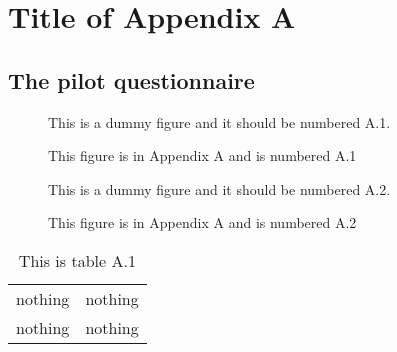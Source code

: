 \appendix
\renewcommand{\chaptermark}[1]%
	{\markboth{Appendix \thechapter. #1}{}}
\setcounter{chapter}{0}

\chapter{Title of Appendix A}
\label{appendixA}

\section{The pilot questionnaire}


\begin{figure}
This is a dummy figure and it should be numbered A.1.
\caption{This figure is in Appendix A and is numbered A.1}
\end{figure}

\begin{figure}
This is a dummy figure and it should be numbered A.2.
\caption{This figure is in Appendix A and is numbered A.2}
\end{figure}

\begin{table}
\caption{This is table A.1}
\begin{tabular}{ll}
nothing& nothing\\
nothing& nothing\\
\end{tabular}

\end{table}


